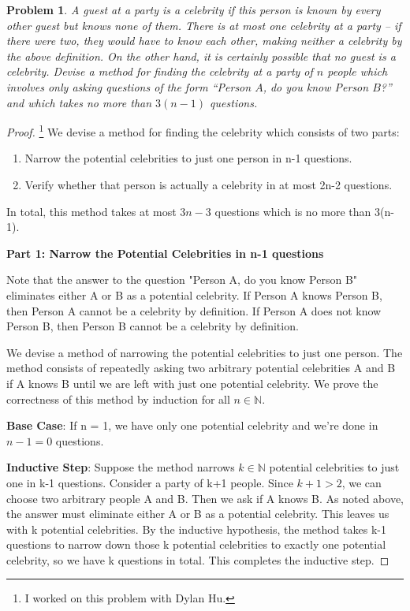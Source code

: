 \documentclass[11pt]{article}
\newtheorem{problem}{Problem}
\theoremstyle{definition}
\theoremstyle{case}
\begin{document}
\begin{problem}
A guest at a party is a \emph{celebrity} if this person is known by every other guest but knows none of them. There is at most one celebrity at a party -- if there were two, they would have to know each other, making neither a celebrity by the above definition. On the other hand, it is certainly possible that no guest is a celebrity. Devise a method for finding the celebrity at a party of $n$ people which involves only asking questions of the form ``Person $A$, do you know Person $B$?'' and which takes no more than $3(n-1)$ questions.
\end{problem}

\begin{proof}
    \footnote{I worked on this problem with Dylan Hu.}
    We devise a method for finding the celebrity which consists of two parts:
    \begin{enumerate}[1.]
        \item Narrow the potential celebrities to just one person in n-1 questions.
        \item Verify whether that person is actually a celebrity in at most 2n-2 questions.
    \end{enumerate}
    In total, this method takes at most $3n-3$ questions which is no more than 3(n-1).

    \textbf{Part 1: Narrow the Potential Celebrities in n-1 questions}
    
    Note that the answer to the question "Person A, do you know Person B"
    eliminates either A or B as a potential celebrity. If Person A knows Person B, then
    Person A cannot be a celebrity by definition. If Person A does not know Person B,
    then Person B cannot be a celebrity by definition.

    We devise a method of narrowing the potential celebrities to just one person. 
    The method consists of 
    repeatedly asking two arbitrary potential celebrities A and B if A knows B
    until we are left with just one potential celebrity. We prove
    the correctness of this method by induction for all $n \in \mathbb{N}$.

    \textbf{Base Case}: If n = 1, we have only one potential celebrity 
    and we're done in $n-1 = 0$ questions.

    \textbf{Inductive Step}: Suppose the method narrows $k \in \mathbb{N}$ 
    potential celebrities
    to just one in k-1 questions. Consider a party of k+1 people. 
    Since $k + 1 > 2$, we can choose two arbitrary
    people A and B. Then we ask if A knows B. As noted above, the answer must
    eliminate either A or B as a potential celebrity. This leaves us with k potential
    celebrities. By the inductive hypothesis, the method takes k-1 questions to narrow down
    those k potential celebrities
    to exactly one potential celebrity, so we have k questions in total. This completes the
    inductive step.


\end{proof}
\end{document}
